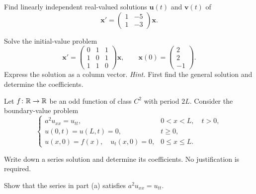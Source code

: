 \documentclass[11pt,oneside]{article}
\begin{document}
\begin{problem}
Find linearly independent real-valued solutions $\mathbf u(t)$ and $\mathbf v(t)$ of
\[\mathbf x'=\begin{pmatrix}1&-5\\1&-3\end{pmatrix}\mathbf x.\]
\end{problem}

\begin{problem}
Solve the initial-value problem
\[\mathbf x'=\begin{pmatrix}0&1&1\\1&0&1\\1&1&0\end{pmatrix}\mathbf x,\qquad\mathbf x(0)=\begin{pmatrix}2\\2\\-1\end{pmatrix}.\]
Express the solution as a column vector. \textit{Hint.} First find the general solution and determine the coefficients.
\end{problem}

\begin{problem}
Let $f\colon\mathbb{R}\to\mathbb{R}$ be an odd function of class $C^2$ with period $2L$. Consider the boundary-value problem
\[\begin{cases}a^2u_{xx}=u_{tt},&0<x<L,\quad t>0,\\u(0,t)=u(L,t)=0,&t\ge0,\\u(x,0)=f(x),\quad u_t(x,0)=0,&0\le x\le L.\end{cases}\]
\begin{problemsubparts}
\item Write down a series solution and determine its coefficients. No justification is required.
\item Show that the series in part (a) satisfies $a^2u_{xx}=u_{tt}$.
\end{problemsubparts}
\end{problem}
\end{document}
